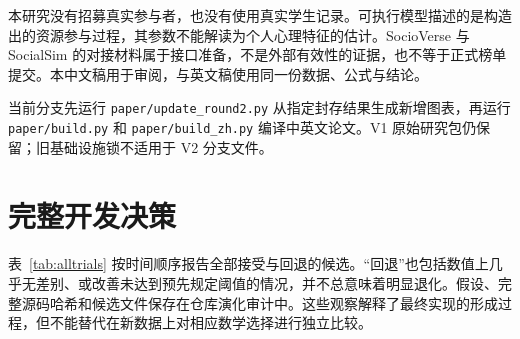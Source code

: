 \documentclass[UTF8,10pt,fontset=none]{ctexart}
\begin{document}
本研究没有招募真实参与者，也没有使用真实学生记录。可执行模型描述的是构造出的资源参与过程，其参数不能解读为个人心理特征的估计。SocioVerse 与 SocialSim 的对接材料属于接口准备，不是外部有效性的证据，也不等于正式榜单提交。本中文稿用于审阅，与英文稿使用同一份数据、公式与结论。

当前分支先运行 \texttt{paper/update\_round2.py} 从指定封存结果生成新增图表，再运行 \texttt{paper/build.py} 和 \texttt{paper/build\_zh.py} 编译中英文论文。V1 原始研究包仍保留；旧基础设施锁不适用于 V2 分支文件。

\section{完整开发决策}
\label{app:trials}
表~\ref{tab:alltrials} 按时间顺序报告全部接受与回退的候选。“回退”也包括数值上几乎无差别、或改善未达到预先规定阈值的情况，并不总意味着明显退化。假设、完整源码哈希和候选文件保存在仓库演化审计中。这些观察解释了最终实现的形成过程，但不能替代在新数据上对相应数学选择进行独立比较。
\footnotesize

\end{document}
